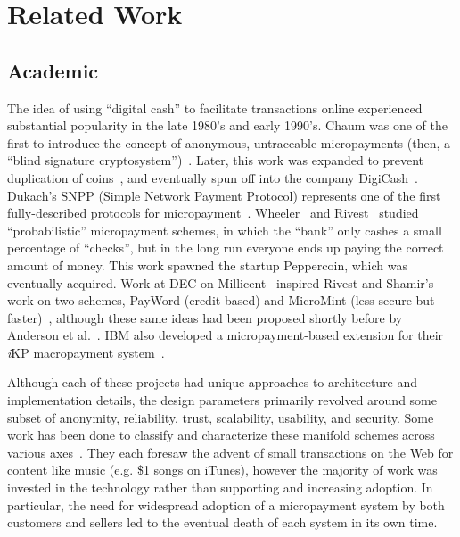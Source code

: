 \section{Related Work}

\subsection{Academic}\label{academic_related}
The idea of using ``digital cash'' to facilitate transactions online experienced substantial popularity in the late 1980's and early 1990's.
Chaum was one of the first to introduce the concept of anonymous, untraceable micropayments (then, a ``blind signature cryptosystem'')~\cite{chaum1983blind}.
Later, this work was expanded to prevent duplication of coins~\cite{chaum1990untraceable}, and eventually spun off into the company DigiCash~\cite{schoenmakers1998security}.
Dukach's SNPP (Simple Network Payment Protocol) represents one of the first fully-described protocols for micropayment~\cite{dukach1992snpp}.
Wheeler~\cite{wheeler1997transactions} and Rivest~\cite{rivest1997electronic} studied ``probabilistic'' micropayment schemes, in which the ``bank'' only cashes a small percentage of ``checks'', but in the long run everyone ends up paying the correct amount of money.
This work spawned the startup Peppercoin, which was eventually acquired.
Work at DEC on Millicent~\cite{manasse1995millicent} inspired Rivest and Shamir's work on two schemes, PayWord (credit-based) and MicroMint (less secure but faster)~\cite{rivest1997payword}, although these same ideas had been proposed shortly before by Anderson et al.~\cite{anderson1997netcard}.
IBM also developed a micropayment-based extension for their \textit{i}KP macropayment system~\cite{hauser1996micro}.

Although each of these projects had unique approaches to architecture and implementation details, the design parameters primarily revolved around some subset of anonymity, reliability, trust, scalability, usability, and security. Some work has been done to classify and characterize these manifold schemes across various axes~\cite{abrazhevich2001classification,parhonyi2005second,parhonyi2006fall}. They each foresaw the advent of small transactions on the Web for content like music (e.g. \$1 songs on iTunes), however the majority of work was invested in the technology rather than supporting and increasing adoption. In particular, the need for widespread adoption of a micropayment system by both customers and sellers led to the eventual death of each system in its own time.

